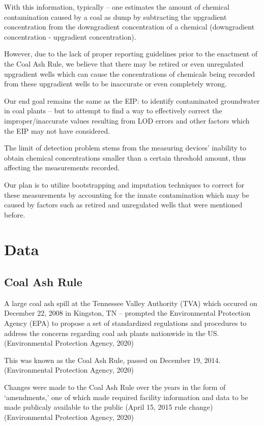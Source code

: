 \documentclass[12pt, twoside]{amherstthesis}
\begin{document}
With this information, typically -- one estimates the amount of chemical contamination caused by a coal as dump by subtracting the upgradient concentration from the downgradient concentration of a chemical (downgradient concentration - upgradient concentration).

However, due to the lack of proper reporting guidelines prior to the enactment of the Coal Ash Rule, we believe that there may be retired or even unregulated upgradient wells which can cause the concentrations of chemicals being recorded from these upgradient wells to be inaccurate or even completely wrong.

Our end goal remains the same as the EIP: to identify contaminated groundwater in coal plants -- but to attempt to find a way to effectively correct the improper/inaccurate values resulting from LOD errors and other factors which the EIP may not have considered.

The limit of detection problem stems from the measuring devices' inability to obtain chemical concentrations smaller than a certain threshold amount, thus affecting the measurements recorded.

Our plan is to utilize bootstrapping and imputation techniques to correct for these measurements by accounting for the innate contamination which may be caused by factors such as retired and unregulated wells that were mentioned before.

\hypertarget{data}{%
\section{Data}\label{data}}

\hypertarget{coalashrule}{%
\subsection{Coal Ash Rule}\label{coalashrule}}

A large coal ash spill at the Tennessee Valley Authority (TVA) which occured on December 22, 2008 in Kingston, TN -- prompted the Environmental Protection Agency (EPA) to propose a set of standardized regulations and procedures to address the concerns regarding coal ash plants nationwide in the US. (Environmental Protection Agency, 2020)

This was known as the Coal Ash Rule, passed on December 19, 2014. (Environmental Protection Agency, 2020)

Changes were made to the Coal Ash Rule over the years in the form of `amendments,' one of which made required facility information and data to be made publicaly available to the public (April 15, 2015 rule change) (Environmental Protection Agency, 2020)
\end{document}
